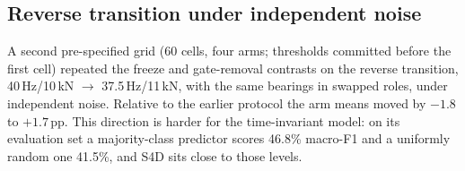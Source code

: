 \subsection{Reverse transition under independent noise}
\label{sec:results:reverse}

A second pre-specified grid (60 cells, four arms; thresholds committed before the first cell) repeated the freeze and gate-removal contrasts on the reverse transition, 40\,Hz/10\,kN $\rightarrow$ 37.5\,Hz/11\,kN, with the same bearings in swapped roles, under independent noise. Relative to the earlier protocol the arm means moved by $-1.8$ to $+1.7$\,pp. This direction is harder for the time-invariant model: on its evaluation set a majority-class predictor scores 46.8\% macro-F1 and a uniformly random one 41.5\%, and S4D sits close to those levels.

